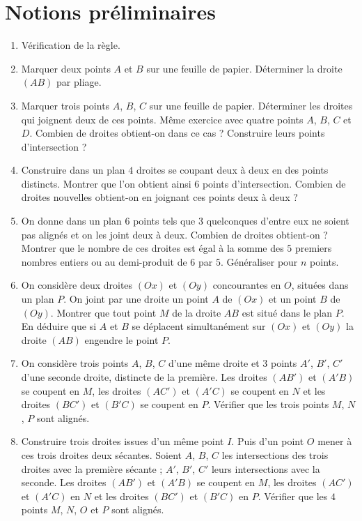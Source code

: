 
\chapter{Notions préliminaires} 
\begin{enumerate}
\item Vérification de la règle. 
\item Marquer deux points $A$ et $B$ sur une feuille de papier. Déterminer la droite $(AB)$ par pliage. 
\item Marquer trois points $A$, $B$, $C$ sur une feuille de papier. Déterminer les droites qui joignent deux de ces points. 
Même exercice avec quatre points $A$, $B$, $C$ et $D$. Combien de droites obtient-on dans ce cas ? Construire leurs points d'intersection ? 
\item Construire dans un plan $4$ droites se coupant deux à deux en des points distincts. Montrer que l'on obtient ainsi $6$ points d'intersection. Combien de droites nouvelles obtient-on en joignant ces points deux à deux ? 
\item On donne dans un plan $6$ points tels que $3$ quelconques d'entre eux ne soient pas alignés et on les joint deux à deux. Combien de droites obtient-on ? Montrer que le nombre de ces droites est égal à la somme des $5$ premiers nombres entiers ou au demi-produit de $6$ par $5$. Généraliser pour $n$ points. 
\item On considère deux droites $(Ox)$ et $(Oy)$ concourantes en $O$, situées dans un plan $P$. On joint par une droite un point $A$ de $(Ox)$ et un point $B$ de $(Oy)$. Montrer que tout point $M$ de la droite $AB$ est situé dans le plan $P$.\\ En déduire que si $A$ et $B$ se 
déplacent simultanément sur $(Ox)$ et $(Oy)$ la droite $(AB)$ engendre le point $P$.
\item On considère trois points $A$, $B$, $C$ d'une même droite et $3$ points $A'$, $B'$, $C'$ d'une seconde droite, distincte de la première. Les droites $(AB')$ et $(A'B)$ se coupent en $M$, les droites $(AC')$ et $(A'C)$ se coupent en $N$ et les droites $(BC')$ et $(B'C)$ se coupent en $P$. Vérifier que les trois points $M$, $N$, $P$ sont alignés.
\item Construire trois droites issues d'un même point $I$. Puis d'un point $O$ mener à ces trois droites deux sécantes. Soient $A$, $B$, $C$
les intersections des trois droites avec la première sécante ; $A'$, $B'$, $C'$ leurs intersections avec la seconde. Les droites $(AB')$ et 
$(A'B)$ se coupent en $M$, les droites $(AC')$ et $(A'C)$ en $N$ et les
droites $(BC')$ et $(B'C)$ en $P$. Vérifier que les $4$ points $M$, $N$, $O$ et $P$ sont alignés. 
\end{enumerate}